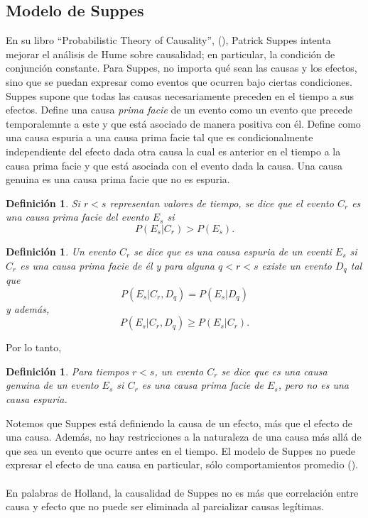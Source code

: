 \documentclass[11pt]{article}
\theoremstyle{plain}
\newtheorem{defi}[teo]{Definición}
\begin{document}
\subsection{Modelo de Suppes}
En su libro “Probabilistic Theory of Causality”, (\cite{suppes1970probabilistic}), Patrick Suppes intenta mejorar el análisis de Hume sobre causalidad; en particular, la condición de conjunción constante. Para Suppes, no importa qué sean las causas y los efectos, sino que se puedan expresar como eventos que ocurren bajo ciertas condiciones. Suppes supone que todas las causas necesariamente preceden en el tiempo a sus efectos. Define una causa \textit{prima facie} de un evento como un evento que precede temporalemnte a este y que está asociado de manera positiva con él. Define como una causa espuria a una causa prima facie tal que es condicionalmente independiente del efecto dada otra causa la cual es anterior en el tiempo a la causa prima facie y que está asociada con el evento dada la causa. Una causa genuina es una causa prima facie que no es espuria.
\begin{defi}
Si $r < s$ representan valores de tiempo, se dice que el evento $C_r$ es una causa prima facie del evento $E_s$ si
\[ P(E_s | C_r ) > P(E_s). \]
\end{defi}
\begin{defi}
Un evento $C_r$ se dice que es una causa espuria de un eventi $E_s$ si $C_r$ es una causa prima facie de él y para alguna $q < r < s$ existe un evento $D_q$ tal que 
\[P(E_s | C_r, D_q) = P (E_s | D_q) \]
y además,
\[P(E_s | C_r , D_q) \geq P(E_s | C_r). \]
\end{defi}
Por lo tanto,
\begin{defi}
Para tiempos $r < s$, un evento $C_r$ se dice que es una causa genuina de un evento $E_s$ si $C_r$ es una causa prima facie de $E_s$, pero no es una causa espuria.
\end{defi}
Notemos que Suppes está definiendo la causa de un efecto, más que el efecto de una causa. Además, no hay restricciones a la naturaleza de una causa más allá de que sea un evento que ocurre antes en el tiempo. El modelo de Suppes no puede expresar el efecto de una causa en particular, sólo comportamientos promedio (\cite{holland1986statistics}).\\
\\
En palabras de Holland, la causalidad de Suppes no es más que correlación entre causa y efecto que no puede ser eliminada al parcializar causas legítimas.
\end{document}
